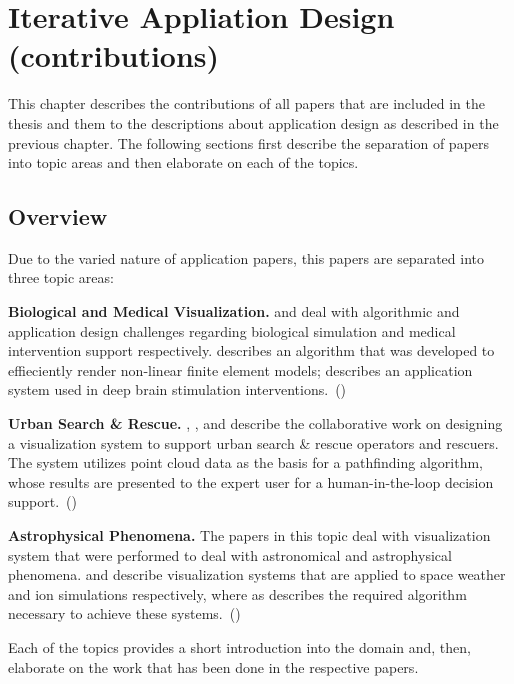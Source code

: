 \chapter{Iterative Appliation Design (contributions)}
\label{contributions}

This chapter describes the contributions of all papers that are included in the thesis and them to the descriptions about application design as described in the previous chapter. The following sections first describe the separation of papers into topic areas and then elaborate on each of the topics.

\section{Overview}
\label{contributions:overview}
Due to the varied nature of application papers, this papers are separated into three topic areas:

\textbf{Biological and Medical Visualization. }  and  deal with algorithmic and application design challenges regarding biological simulation and medical intervention support respectively.  describes an algorithm that was developed to effieciently render non-linear finite element models;  describes an application system used in deep brain stimulation interventions.~()

\textbf{Urban Search \& Rescue. } , , and  describe the collaborative work on designing a visualization system to support urban search \& rescue operators and rescuers. The system utilizes  point cloud data as the basis for a pathfinding algorithm, whose results are presented to the expert user for a human-in-the-loop decision support.~()

\textbf{Astrophysical Phenomena. } The papers in this topic deal with visualization system that were performed to deal with astronomical and astrophysical phenomena.  and  describe visualization systems that are applied to space weather and ion simulations respectively, where as  describes the required algorithm necessary to achieve these systems.~()

Each of the topics provides a short introduction into the domain and, then, elaborate on the work that has been done in the respective papers.


